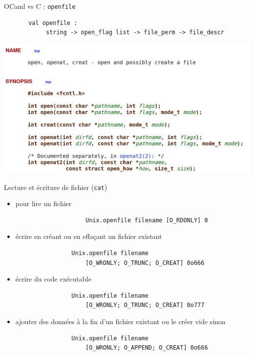 \begin{frame}[fragile]{OCaml vs C : \texttt{openfile}}
    \begin{lstlisting}
       val openfile : 
            string -> open_flag list -> file_perm -> file_descr
     \end{lstlisting}
    \includegraphics[width=\textwidth]{slides/images/c_api_open.png}
\end{frame}

\begin{frame}[fragile]{Lecture et écriture de fichier (\texttt{cat})}
     \begin{itemize}[label=\small{}]
         \item<1-> pour lire un fichier
             \begin{lstlisting}
                    Unix.openfile filename [O_RDONLY] 0
             \end{lstlisting}
         \item<2-> écrire en créant ou en effaçant un fichier existant
             \begin{lstlisting}
                Unix.openfile filename 
                    [O_WRONLY; O_TRUNC; O_CREAT] 0o666
            \end{lstlisting}
        \item<3-> écrire du code exécutable
             \begin{lstlisting}
                Unix.openfile filename 
                    [O_WRONLY; O_TRUNC; O_CREAT] 0o777
            \end{lstlisting}
        \item<4-> ajouter des données à la fin d'un fichier existant ou le créer vide sinon
             \begin{lstlisting}
                Unix.openfile filename 
                    [O_WRONLY; O_APPEND; O_CREAT] 0o666
            \end{lstlisting}
     \end{itemize} 
\end{frame}

